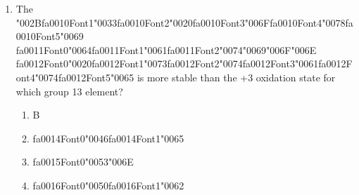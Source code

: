 \documentclass[12pt]{article}
\begin{document}
\begin{enumerate}[label=\arabic*.]
\begin{enumerate}[label=(\alph*)]
\end{enumerate}
\item The {\char"002B}{\csname fa0010Font1\endcsname\char"0033}{\csname fa0010Font2\endcsname\char"0020}{\csname fa0010Font3\endcsname\char"006F}{\csname fa0010Font4\endcsname\char"0078}{\csname fa0010Font5\endcsname\char"0069} {\csname fa0011Font0\endcsname\char"0064}{\csname fa0011Font1\endcsname\char"0061}{\csname fa0011Font2\endcsname\char"0074}{\char"0069}{\char"006F}{\char"006E} {\csname fa0012Font0\endcsname\char"0020}{\csname fa0012Font1\endcsname\char"0073}{\csname fa0012Font2\endcsname\char"0074}{\csname fa0012Font3\endcsname\char"0061}{\csname fa0012Font4\endcsname\char"0074}{\csname fa0012Font5\endcsname\char"0065} is more stable than the +3 oxidation state for which group 13 element?
\begin{enumerate}[label=(\alph*)]
    \item B
    \item {\csname fa0014Font0\endcsname\char"0046}{\csname fa0014Font1\endcsname\char"0065}
    \item {\csname fa0015Font0\endcsname\char"0053}{\char"006E}
    \item {\csname fa0016Font0\endcsname\char"0050}{\csname fa0016Font1\endcsname\char"0062}
\end{enumerate}
\end{enumerate}
\end{document}
